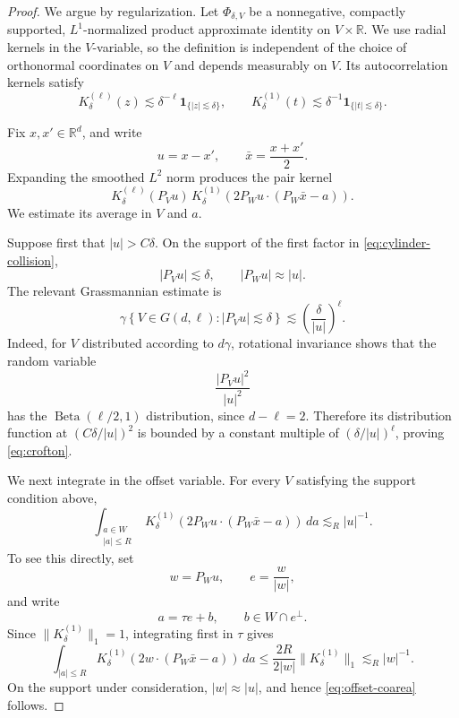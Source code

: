 \documentclass[11pt]{article}
\theoremstyle{remark}
\newcommand{\R}{\mathbb R}
\numberwithin{equation}{section}
\newcommand{\1}{\mathbf 1}
\begin{document}
\begin{proof}
We argue by regularization.  Let \(\Phi_{\delta,V}\) be a nonnegative,
compactly supported, \(L^1\)-normalized product approximate identity on
\(V\times\R\).  We use radial kernels in the \(V\)-variable, so the
definition is independent of the choice of orthonormal coordinates on
\(V\) and depends measurably on \(V\).  Its autocorrelation kernels
satisfy
\begin{equation}
K_\delta^{(\ell)}(z)
\lesssim
\delta^{-\ell}\mathbf1_{\{\lvert z\rvert\lesssim\delta\}},
\qquad
K_\delta^{(1)}(t)
\lesssim
\delta^{-1}\mathbf1_{\{\lvert t\rvert\lesssim\delta\}}.
\label{eq:kernel-bounds}
\end{equation}

Fix \(x,x'\in\R^d\), and write
\[
u=x-x',
\qquad
\bar x=\frac{x+x'}2.
\]
Expanding the smoothed \(L^2\) norm produces the pair kernel
\begin{equation}
K_\delta^{(\ell)}(P_Vu)\,
K_\delta^{(1)}
\!\left(
2P_Wu\cdot(P_W\bar x-a)
\right).
\label{eq:cylinder-collision}
\end{equation}
We estimate its average in \(V\) and \(a\).

Suppose first that \(\lvert u\rvert>C\delta\).  On the support of the
first factor in \eqref{eq:cylinder-collision},
\[
\lvert P_Vu\rvert\lesssim\delta,
\qquad
\lvert P_Wu\rvert\approx\lvert u\rvert.
\]
The relevant Grassmannian estimate is
\begin{equation}
\gamma\left\{
V\in G(d,\ell):
\lvert P_Vu\rvert\lesssim\delta
\right\}
\lesssim
\left(\frac{\delta}{\lvert u\rvert}\right)^\ell.
\label{eq:crofton}
\end{equation}
Indeed, for \(V\) distributed according to \(d\gamma\), rotational
invariance shows that the random variable
\[
\frac{\lvert P_Vu\rvert^2}{\lvert u\rvert^2}
\]
has the \(\operatorname{Beta}(\ell/2,1)\) distribution, since
\(d-\ell=2\).  Therefore its distribution function at
\((C\delta/\lvert u\rvert)^2\) is bounded by a constant multiple of
\((\delta/\lvert u\rvert)^\ell\), proving \eqref{eq:crofton}.

We next integrate in the offset variable.  For every \(V\) satisfying
the support condition above,
\begin{equation}
\int_{\substack{a\in W\\ \lvert a\rvert\leq R}}
K_\delta^{(1)}
\!\left(
2P_Wu\cdot(P_W\bar x-a)
\right)\,da
\lesssim_R
\lvert u\rvert^{-1}.
\label{eq:offset-coarea}
\end{equation}
To see this directly, set
\[
w=P_Wu,
\qquad
e=\frac{w}{\lvert w\rvert},
\]
and write
\[
a=\tau e+b,
\qquad
b\in W\cap e^\perp.
\]
Since \(\|K_\delta^{(1)}\|_1=1\), integrating first in \(\tau\) gives
\[
\int_{\lvert a\rvert\leq R}
K_\delta^{(1)}
\!\left(
2w\cdot(P_W\bar x-a)
\right)\,da
\leq
\frac{2R}{2\lvert w\rvert}
\|K_\delta^{(1)}\|_1
\lesssim_R
\lvert w\rvert^{-1}.
\]
On the support under consideration,
\(\lvert w\rvert\approx\lvert u\rvert\), and hence
\eqref{eq:offset-coarea} follows.


\end{proof}
\end{document}
